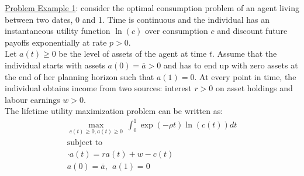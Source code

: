 \documentclass{article}
\begin{document}
\vspace{2.5mm}
\par \underline{Problem Example 1}: consider the optimal consumption problem of an agent living between two dates, 0 and 1. Time is continuous and the individual has an instantaneous utility function $\ln(c)$ over consumption $c$ and discount future payoffs exponentially at rate $p > 0$. \\ Let $a(t) \geq 0$ be the level of assets of the agent at time $t$. Assume that the individual starts with assets $a(0) = \overline{a} > 0$ and has to end up with zero assets at the end of her planning horizon such that $a(1) = 0$. At every point in time, the individual obtains income from two sources: interest $r > 0$ on asset holdings and labour earnings $w > 0$. \\ The lifetime utility maximization problem can be written as:
\begin{gather*}
    \max_{c(t) \geq 0, a(t) \geq 0} \ \int_{0}^{1} \exp (- \rho t) \ln (c(t)) dt \\
    \text{subject to} \\
    \cdot{a}(t) = r a(t) + w - c(t) \\
    a(0) = \overline{a}, \ \ a(1) = 0
\end{gather*}
\end{document}
